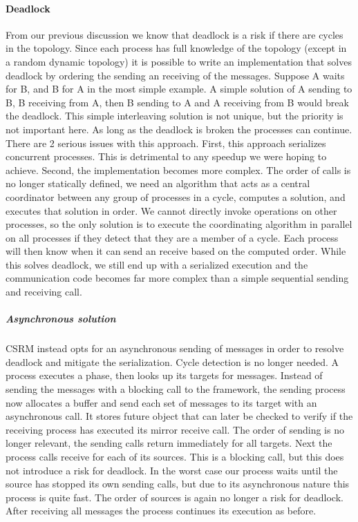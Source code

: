 \paragraph{Deadlock}
From our previous discussion we know that deadlock is a risk if there are cycles in the topology. Since each process has full knowledge of the topology (except in a random dynamic topology) it is possible to write an implementation that solves deadlock by ordering the sending an receiving of the messages. Suppose A waits for B, and B for A in the most simple example. A simple solution of A sending to B, B receiving from A, then B sending to A and A receiving from B would break the deadlock. This simple interleaving solution is not unique, but the priority is not important here. As long as the deadlock is broken the processes can continue. There are 2 serious issues with this approach. First, this approach serializes concurrent processes. This is detrimental to any speedup we were hoping to achieve. Second, the implementation becomes more complex. The order of calls is no longer statically defined, we need an algorithm that acts as a central coordinator between any group of processes in a cycle, computes a solution, and executes that solution in order. We cannot directly invoke operations on other processes, so the only solution is to execute the coordinating algorithm in parallel on all processes if they detect that they are a member of a cycle. Each process will then know when it can send an receive based on the computed order. While this solves deadlock, we still end up with a serialized execution and the communication code becomes far more complex than a simple sequential sending and receiving call.
\subparagraph{Asynchronous solution}
CSRM instead opts for an asynchronous sending of messages in order to resolve deadlock and mitigate the serialization. Cycle detection is no longer needed. 
A process executes a phase, then looks up its targets for messages. Instead of sending the messages with a blocking call to the framework, the sending process now allocates a buffer and send each set of messages to its target with an asynchronous call. It stores future object that can later be checked to verify if the receiving process has executed its mirror receive call. 
The order of sending is no longer relevant, the sending calls return immediately for all targets. 
Next the process calls receive for each of its sources. This is a blocking call, but this does not introduce a risk for deadlock.
In the worst case our process waits until the source has stopped its own sending calls, but due to its asynchronous nature this process is quite fast. The order of sources is again no longer a risk for deadlock. After receiving all messages the process continues its execution as before.
